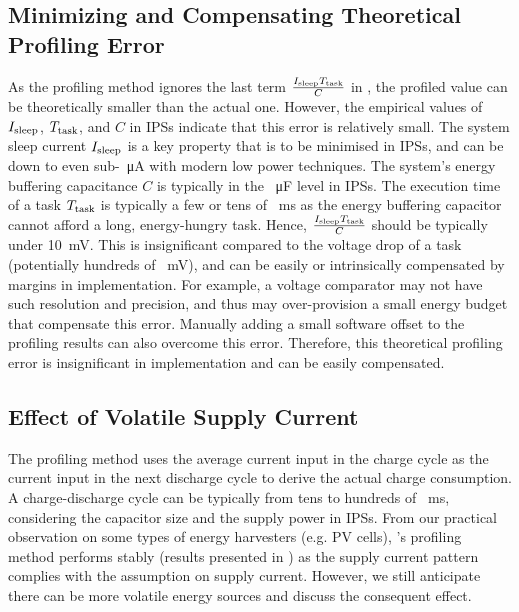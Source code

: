 \subsection{Minimizing and Compensating Theoretical Profiling Error}

As the profiling method ignores the last term $\frac{I_{\text{sleep}}T_{\text{task}}}{C}$ in , the profiled value can be theoretically smaller than the actual one.
However, the empirical values of $I_{\text{sleep}}$, $T_{\text{task}}$, and $C$ in IPSs indicate that this error is relatively small. 
The system sleep current $I_{\text{sleep}}$ is a key property that is to be minimised in IPSs, and can be down to even sub-\SI{}{\micro\ampere} with modern low power techniques. 
The system's energy buffering capacitance $C$ is typically in the \SI{}{\micro\farad} level in IPSs. 
The execution time of a task $T_{\text{task}}$ is typically a few or tens of \SI{}{\milli\second} as the energy buffering capacitor cannot afford a long, energy-hungry task. 
Hence, $\frac{I_{\text{sleep}}T_{\text{task}}}{C}$ should be typically under \SI{10}{\milli\volt}. 
This is insignificant compared to the voltage drop of a task (potentially hundreds of \SI{}{\milli\volt}), and can be easily or intrinsically compensated by margins in implementation.
For example, a voltage comparator may not have such resolution and precision, and thus may over-provision a small energy budget that compensate this error. 
Manually adding a small software offset to the profiling results can also overcome this error. 
Therefore, this theoretical profiling error is insignificant in implementation and can be easily compensated. 

    
\subsection{Effect of Volatile Supply Current}

The profiling method uses the average current input in the charge cycle as the current input in the next discharge cycle to derive the actual charge consumption. 
A charge-discharge cycle can be typically from tens to hundreds of \SI{}{\milli\second}, considering the capacitor size and the supply power in IPSs.
From our practical observation on some types of energy harvesters (e.g. PV cells), \nn{}'s profiling method performs stably (results presented in ) as the supply current pattern complies with the assumption on supply current. 
However, we still anticipate there can be more volatile energy sources and discuss the consequent effect. 

